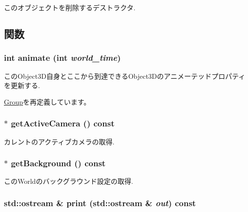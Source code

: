 このオブジェクトを削除するデストラクタ. 

\subsection{関数}
\hypertarget{classm3g_1_1World_8aad1ceab4c2a03609c8a42324ce484d}{
\subsubsection[{animate}]{\setlength{\rightskip}{0pt plus 5cm}int animate (int {\em world\_\-time})}}
\label{classm3g_1_1World_8aad1ceab4c2a03609c8a42324ce484d}


このObject3D自身とここから到達できるObject3Dのアニメーテッドプロパティを更新する. 

\hyperlink{classm3g_1_1Group_8aad1ceab4c2a03609c8a42324ce484d}{Group}を再定義しています。\hypertarget{classm3g_1_1World_812e01ec4fd0fd872b0ca5ea6a30b2f6}{
\subsubsection[{getActiveCamera}]{ $\ast$ getActiveCamera () const}}
\label{classm3g_1_1World_812e01ec4fd0fd872b0ca5ea6a30b2f6}


カレントのアクティブカメラの取得. \hypertarget{classm3g_1_1World_fb10ab7fd2ad14b7b1d49caf129670e0}{
\subsubsection[{getBackground}]{ $\ast$ getBackground () const}}
\label{classm3g_1_1World_fb10ab7fd2ad14b7b1d49caf129670e0}


このWorldのバックグラウンド設定の取得. \hypertarget{classm3g_1_1World_6fea17fa1532df3794f8cb39cb4f911f}{
\subsubsection[{print}]{\setlength{\rightskip}{0pt plus 5cm}std::ostream \& print (std::ostream \& {\em out}) const}}
\label{classm3g_1_1World_6fea17fa1532df3794f8cb39cb4f911f}


